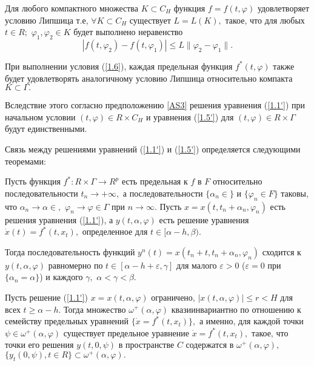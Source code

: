 	\begin{Ass}\label{AS3} Для любого компактного множества $K\subset C_H$
		функция $f=f(t,\varphi )$ удовлетворяет условию Липшица т.е, $\forall K\subset C_H$ существует $L=L(K),$ такое, что  для любых
		$t\in R;$ $\varphi _1, \varphi _2\in K$ будет выполнено неравенство
		\begin{equation}
		|f(t,\varphi _2)-f(t,\varphi _1)|\le L\|\varphi _2-\varphi _1\|.
		\label{1.6}
		\end{equation}
	\end{Ass}
	
	При выполнении условия (\ref{1.6}), каждая
	предельная функция $f^*(t,\varphi )$ также будет удовлетворять
	аналогичному условию Липшица относительно компакта
	$K\subset\Gamma.$
	
	Вследствие этого согласно предположению  \ref{AS3}
	решения
	уравнения (\ref{1.1'}) при начальном условии $(t,\varphi )\in R 
	\times C_H$ и уравнения (\ref{1.5'}) для $(t,\varphi )\in R
	\times\Gamma $ будут единственными.
	
	Связь между решениями уравнений  (\ref{1.1'})  и  (\ref{1.5'})
	определяется следующими теоремами:
	
	\begin{Th}\label{t-1.1} Пусть функция $f^*: R \times\Gamma\to R^p$ есть предельная к $f$ в
		$F$ относительно последовательности $t_n\to +\infty, $ а
		последовательности $\{\alpha _n\in \}$ и $\{\varphi _n\in F\}$
		таковы, что $\alpha _n\to\alpha\in ,$ $\varphi
		_n\to\varphi\in\Gamma $ при $n\to\infty .$ Пусть $x=x(t,t_n+\alpha
		_n,\varphi _n)$  есть  решения  уравнения (\ref{1.1'}), а
		$y(t,\alpha ,\varphi )$ есть решение уравнения $\dot
		x(t)=f^*(t,x_t),$ определенное для $t\in [\alpha -h,\beta ).$
		
		Тогда последовательность   функций $y^{n}(t)=x(t_n+t,t_n+\alpha
		_n,\varphi _n)$ сходится  к $y(t,\alpha ,\varphi )$ равномерно  по
		$t\in [\alpha -h+\varepsilon,\gamma ]$ для малого $\varepsilon>0$
		($\varepsilon=0$ при $\{ \alpha_n=\alpha\}$) и каждого $\gamma,$
		$\alpha<\gamma <\beta .$
	\end{Th}
	
	\begin{Th}\label{t-1.2}  Пусть  решение  (\ref{1.1'}) $x=x(t,\alpha ,\varphi )$
		ограничено, $|x(t,\alpha ,\varphi)|\le r<H$ для всех $t\ge \alpha
		-h.$ Тогда множество $\omega ^+(\alpha ,\varphi )$
		квазиинвариантно по отношению к семейству предельных уравнений
		$\{\dot x=f^*(t,x_t)\},$ а именно,  для  каждой точки $\psi\in\omega
		^+(\alpha ,\varphi )$ существует предельное уравнение $\dot
		x=f^*(t,x_t),$ такое, что точки его решения
		$y(t,0,\psi )$ в пространстве $C$ содержатся в $\omega^+(\alpha,\varphi ),$
		$\{ y_t(0,\psi ), t\in R\}\subset\omega ^+(\alpha ,\varphi ).$
	\end{Th}
	
